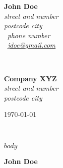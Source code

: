 \documentclass[11pt]{article}
\begin{document}
\sffamily   %
\hfill%
\begin{minipage}[t]{.6\textwidth}
\raggedleft%
{\bfseries John Doe}\\[.35ex]
\small\itshape%
street and number\\
postcode city\\[.35ex]
\Telefon~phone number\\
\Letter~\href{mailto:jdoe@gmail.com}{jdoe@gmail.com}
\end{minipage}\\[1em]
%
\begin{minipage}[t]{.4\textwidth}
\raggedright%
{\bfseries Company XYZ}\\[.35ex]
\small\itshape%
street and number\\
postcode city
\end{minipage}
\hfill %
\begin{minipage}[t]{.4\textwidth}
\raggedleft %
\today
\end{minipage}\\[2em]
\raggedright
\calligra 
$body$

{\bfseries John Doe}\\
%
\end{document}
